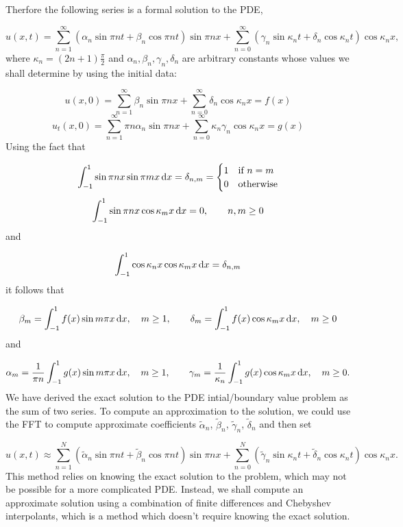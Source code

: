 \documentclass[12pt,a4paper]{article}
\begin{document}
Therfore the following series is a formal solution to the PDE,

\[
u(x,t) = \sum_{n = 1}^{\infty} \left(\alpha_n\sin\pi n t + \beta_n\cos\pi n t  \right)\sin\pi n x +  \sum_{n = 0}^{\infty} \left(\gamma_n\sin \kappa_n t + \delta_n\cos \kappa_n t  \right)\cos\kappa_n x,
\]
where $\kappa_n =(2n + 1)\frac{\pi}{2}$ and  $\alpha_n, \beta_n, \gamma_n, \delta_n$ are arbitrary constants whose values we shall determine by using the initial data:

\[
u(x,0) = \sum_{n = 1}^{\infty} \beta_n  \sin\pi n x +  \sum_{n = 0}^{\infty} \delta_n \cos\kappa_n x = f(x)
\]
\[
u_t(x,0) = \sum_{n = 1}^{\infty} \pi n\alpha_n  \sin\pi n x +  \sum_{n = 0}^{\infty}\kappa_n \gamma_n \cos\kappa_n x = g(x)
\]
Using the fact that 

\[
\int_{-1}^{1} \sin \pi n x \sin \pi m x\, {\rm d}x = \delta_{n,m} = \begin{cases}
1 & \text{if } n = m \\
0 & \text{otherwise}
\end{cases}
\]
\[
\int_{-1}^{1} \sin \pi n x \cos \kappa_m x\, {\rm d}x = 0, \qquad n, m \geq 0 
\]
and

\[
\int_{-1}^{1} \cos \kappa_n x \cos \kappa_m x\, {\rm d}x = \delta_{n,m} 
\]
it follows that

\[
\beta_m = \int_{-1}^{1} f(x) \sin m\pi x \,{\rm d}x, \quad m\geq 1, \qquad \delta_m = \int_{-1}^{1} f(x) \cos \kappa_m x \,{\rm d}x,\quad m \geq 0
\]
and

\[
\alpha_m = \frac{1}{\pi n}\int_{-1}^{1} g(x) \sin m\pi x \,{\rm d}x, \quad m\geq 1, \qquad \gamma_m = \frac{1}{\kappa_n}\int_{-1}^{1} g(x) \cos \kappa_m x \,{\rm d}x,\quad m \geq 0.
\]
We have derived the exact solution to the PDE intial/boundary value problem as the sum of two series.  To compute an approximation to the solution, we could use the FFT to compute approximate coefficients  $\tilde{\alpha}_n$, $\tilde{\beta}_n$, $\tilde{\gamma}_n$, $\tilde{\delta}_n$ and then set

\[
u(x,t) \approx \sum_{n = 1}^{N} \left(\tilde{\alpha}_n\sin\pi n t + \tilde{\beta}_n\cos\pi n t  \right)\sin\pi n x +  \sum_{n = 0}^{N} \left(\tilde{\gamma}_n\sin \kappa_n t + \tilde{\delta}_n\cos \kappa_n t  \right)\cos\kappa_n x.
\]
This method relies on knowing the exact solution to the problem, which may not be possible for a more complicated PDE. Instead, we shall compute an approximate solution using a combination of finite differences and Chebyshev interpolants, which is a method which doesn't require knowing the exact solution.
\end{document}
